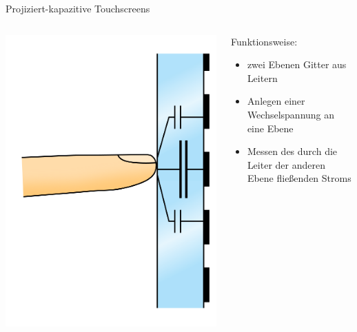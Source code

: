 \documentclass[12pt]{beamer}
\begin{document}
	\begin{frame}{Projiziert-kapazitive Touchscreens}
		\begin{columns}
			\begin{column}{0.4\textwidth}
				\includegraphics[width=\textwidth]{../Images/ProjectedCapacitiveTouchScreen.png}
			\end{column}
			\begin{column}{0.6\textwidth}
				Funktionsweise:
				\begin{itemize}
					\item<+-> zwei Ebenen Gitter aus Leitern
					\item<+-> Anlegen einer Wechselspannung an eine Ebene
					\item<+-> Messen des durch die Leiter der anderen Ebene fließenden Stroms
				\end{itemize}
			\end{column}
		\end{columns}
	\end{frame}
	
\end{document}
